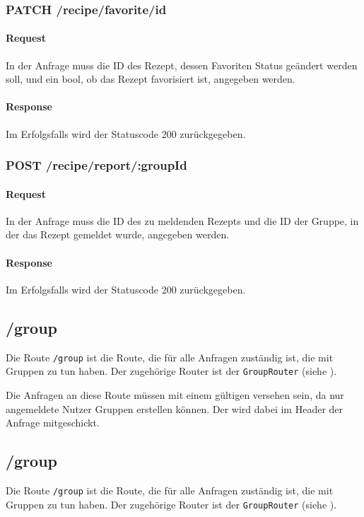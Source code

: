 \documentclass{entwurfsheft}
\begin{document}
\subsubsection*{PATCH /recipe/favorite/id}
    \paragraph{Request}
        In der Anfrage muss die ID des Rezept, dessen Favoriten Status geändert werden soll, und ein \gls{bool}, ob das Rezept favorisiert ist, angegeben werden.
    \paragraph{Response}
        Im Erfolgsfalls wird der Statuscode 200 zurückgegeben.
        
\subsubsection*{POST /recipe/report/:groupId}
    \paragraph{Request}
        In der Anfrage muss die ID des zu meldenden Rezepts und die ID der Gruppe, in der das Rezept gemeldet wurde, angegeben werden.
    \paragraph{Response}
        Im Erfolgsfalls wird der Statuscode 200 zurückgegeben.


\subsection{/group}
Die Route \texttt{/group} ist die Route, die für alle Anfragen zuständig ist, die mit Gruppen zu tun haben.
Der zugehörige Router ist der \texttt{GroupRouter} (siehe ).

Die Anfragen an diese Route müssen mit einem gültigen  versehen sein, da nur angemeldete Nutzer Gruppen erstellen können.
Der  wird dabei im Header der Anfrage mitgeschickt.

\subsection{/group}
Die Route \texttt{/group} ist die Route, die für alle Anfragen zuständig ist, die mit Gruppen zu tun haben.
Der zugehörige Router ist der \texttt{GroupRouter} (siehe ).
\end{document}
